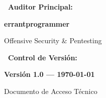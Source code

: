 \documentclass[11pt,a4paper,oneside]{report}
\begin{document}
\begin{titlepage}
  \begin{minipage}[t]{0.48\textwidth}
    \small\color{csecDark}\textbf{\faUserShield\ Auditor Principal:}\par
    \vspace{2pt}
    \large\textbf{\color{csecDark}errantprogrammer}\par
    \vspace{1pt}
    \scriptsize\color{csecMuted}Offensive Security \& Pentesting
  \end{minipage}
  \hfill
  \begin{minipage}[t]{0.48\textwidth}
    \flushright
    \small\color{csecDark}\textbf{\faFileCode\ Control de Versión:}\par
    \vspace{2pt}
    \normalsize\textbf{\color{csecDark}Versión 1.0 --- \today}\par
    \vspace{1pt}
    \scriptsize\color{csecMuted}Documento de Acceso Técnico
  \end{minipage}
  \vspace*{0.5cm}
\end{titlepage}
\end{document}
